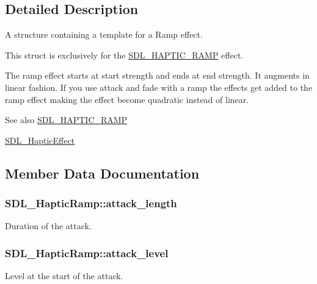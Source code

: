 \subsection{Detailed Description}
A structure containing a template for a Ramp effect. 

This struct is exclusively for the \hyperlink{SDL__haptic_8h_af10eb937a64a8f602e9c46682ac0d868}{S\+D\+L\+\_\+\+H\+A\+P\+T\+I\+C\+\_\+\+R\+A\+M\+P} effect.

The ramp effect starts at start strength and ends at end strength. It augments in linear fashion. If you use attack and fade with a ramp the effects get added to the ramp effect making the effect become quadratic instead of linear.

\begin{DoxySeeAlso}{See also}
\hyperlink{SDL__haptic_8h_af10eb937a64a8f602e9c46682ac0d868}{S\+D\+L\+\_\+\+H\+A\+P\+T\+I\+C\+\_\+\+R\+A\+M\+P} 

\hyperlink{unionSDL__HapticEffect}{S\+D\+L\+\_\+\+Haptic\+Effect} 
\end{DoxySeeAlso}


\subsection{Member Data Documentation}
\hypertarget{structSDL__HapticRamp_adbcd7ffb05016d442c73e81cc0fcbbd2}{}
\subsubsection[{attack\+\_\+length}]{ S\+D\+L\+\_\+\+Haptic\+Ramp\+::attack\+\_\+length}\label{structSDL__HapticRamp_adbcd7ffb05016d442c73e81cc0fcbbd2}
Duration of the attack. \hypertarget{structSDL__HapticRamp_a755933bbda14ae9b53c574b9fe6291a0}{}
\subsubsection[{attack\+\_\+level}]{ S\+D\+L\+\_\+\+Haptic\+Ramp\+::attack\+\_\+level}\label{structSDL__HapticRamp_a755933bbda14ae9b53c574b9fe6291a0}
Level at the start of the attack. \hypertarget{structSDL__HapticRamp_a2027c6fd88f1ebe652c90c71410ee0bf}{}

